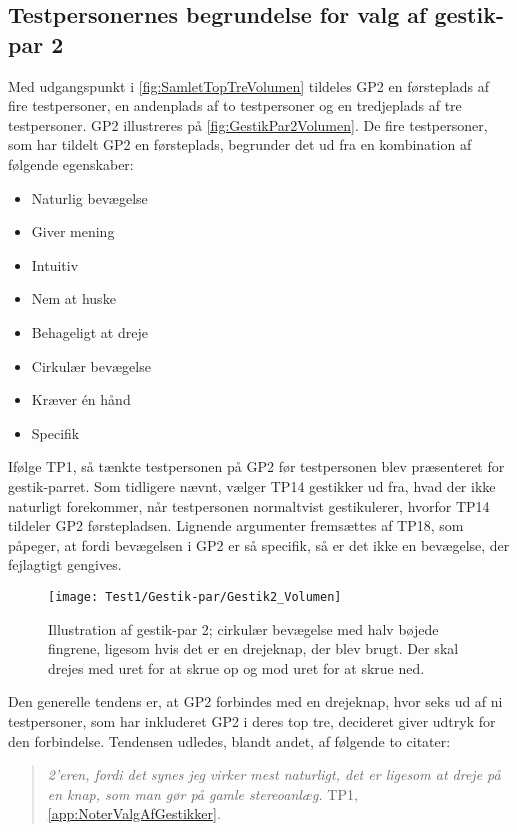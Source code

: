 \subsection{Testpersonernes begrundelse for valg af gestik-par 2}
\label{TestresultaterValgAfGestikkerBegrundelseGP2Volumen}
%
Med udgangspunkt i \autoref{fig:SamletTopTreVolumen} tildeles GP2 en førsteplads af fire testpersoner, en andenplads af to testpersoner og en tredjeplads af tre testpersoner. GP2 illustreres på \autoref{fig:GestikPar2Volumen}. De fire testpersoner, som har tildelt GP2 en førsteplads, begrunder det ud fra en kombination af følgende egenskaber: 
%
\begin{multicols}{3}
    \begin{itemize}
        \item Naturlig bevægelse
        \item Giver mening
        \item Intuitiv 
        \item Nem at huske
        \item Behageligt at dreje
        \item Cirkulær bevægelse
        \item Kræver én hånd
        \item Specifik
\end{itemize}
\end{multicols}
\noindent
%
Ifølge TP1, så tænkte testpersonen på GP2 før testpersonen blev præsenteret for gestik-parret. Som tidligere nævnt, vælger TP14 gestikker ud fra, hvad der ikke naturligt forekommer, når testpersonen normaltvist gestikulerer, hvorfor TP14 tildeler GP2 førstepladsen. Lignende argumenter fremsættes af TP18, som påpeger, at fordi bevægelsen i GP2 er så specifik, så er det ikke en bevægelse, der fejlagtigt gengives. 
%
\begin{figure}[H]
	\centering
	\texttt{[image: Test1/Gestik-par/Gestik2\_Volumen]}
	\caption{Illustration af gestik-par 2; cirkulær bevægelse med halv bøjede fingrene, ligesom hvis det er en drejeknap, der blev brugt. Der skal drejes med uret for at skrue op og mod uret for at skrue ned.}
	\label{fig:GestikPar2Volumen}
\end{figure}
\noindent
%
Den generelle tendens er, at GP2 forbindes med en drejeknap, hvor seks ud af ni testpersoner, som har inkluderet GP2 i deres top tre, decideret giver udtryk for den forbindelse. Tendensen udledes, blandt andet, af følgende to citater: 
%
\begin{quotation}
	\noindent
	\textit{2'eren, fordi det synes jeg virker mest naturligt, det er ligesom at dreje på en knap, som man gør på gamle stereoanlæg.} TP1, \autoref{app:NoterValgAfGestikker}.
\noindent
\end{quotation}
